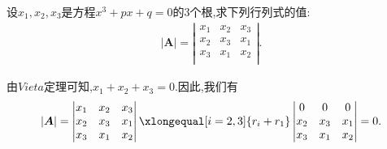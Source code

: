 \documentclass[lang=cn,newtx,10pt,scheme=chinese]{elegantbook}
\begin{document}
\begin{exercise}
设$x_1,x_2,x_3$是方程$x^3+px+q=0$的3个根,求下列行列式的值:
\begin{gather}
\left| \boldsymbol{A} \right|=\left| \begin{matrix}
x_1&		x_2&		x_3\\
x_2&		x_3&		x_1\\
x_3&		x_1&		x_2\\
\end{matrix} \right|.
\nonumber
\end{gather}
\begin{solution}
由$Vieta$定理可知,$x_1+x_2+x_3=0$.因此,我们有
\begin{equation}
\begin{split}
\left| \boldsymbol{A} \right|=\left| \begin{matrix}
x_1&		x_2&		x_3\\
x_2&		x_3&		x_1\\
x_3&		x_1&		x_2\\
\end{matrix} \right|\xlongequal[i=2,3]{r_i+r_1}\left| \begin{matrix}
0&		0&		0\\
x_2&		x_3&		x_1\\
x_3&		x_1&		x_2\\
\end{matrix} \right|=0.
\end{split}
\nonumber
\end{equation}
\end{solution}
\end{exercise}
\end{document}
